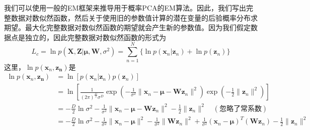 我们可以使用一般的EM框架来推导用于概率PCA的EM算法。因此，我们写出完整数据对数似然函数，然后关于使用旧的参数值计算的潜在变量的后验概率分布求期望。最大化完整数据对数似然函数的期望就会产生新的参数值。因为我们假定数据点是独立的，因此完整数据对数似然函数的形式为
\begin{equation}
	L_c=\ln p(\boldsymbol{X},\boldsymbol{Z}|\boldsymbol{\mu},\boldsymbol{W},\sigma^2)=\sum_{n=1}^{N}\{\ln p(\boldsymbol{x}_n|\boldsymbol{z}_n)+\ln p(\boldsymbol{z}_n) \}
\end{equation}
这里，$\ln p(\boldsymbol{x}_n,\boldsymbol{z_n})$是
\begin{equation}
	\begin{aligned}
		\ln p(\boldsymbol{x}_n,\boldsymbol{z_n})&=\ln[p(\boldsymbol{x}_n|\boldsymbol{z}_n)p(\boldsymbol{z}_n)]\\
		&=\ln \left[\frac{1}{(2\pi)^{\frac{D}{2}}\sigma^D}\exp (-\frac{1}{\sigma^2}\lVert \boldsymbol{x}_n-\boldsymbol{\mu}-\boldsymbol{Wz}_n\rVert^2)\exp(-\frac{1}{2}\lVert\boldsymbol{z}_n\rVert^2) \right]\\
		&=-\frac{D}{2}\ln \sigma^2-\frac{1}{\sigma^2}\lVert \boldsymbol{x}_n-\boldsymbol{\mu}-\boldsymbol{Wz}_n\rVert^2-\frac{1}{2}\lVert\boldsymbol{z}_n\rVert^2\quad (\text{忽略了常系数})\\
		&=-\frac{D}{2}\ln \sigma^2-\frac{1}{\sigma^2}\lVert \boldsymbol{x}_n-\boldsymbol{\mu}\rVert^2-\frac{1}{\sigma^2}\lVert\boldsymbol{Wz}_n\rVert^2+\frac{1}{\sigma^2}(\boldsymbol{x}_n-\boldsymbol{\mu})^T(\boldsymbol{Wz}_n)-\frac{1}{2}\lVert\boldsymbol{z}_n\rVert^2
	\end{aligned}
\end{equation}
